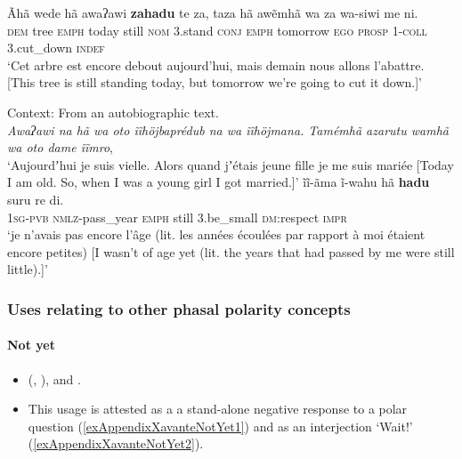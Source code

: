 \begin{exe}
	\ex\label{exAppendixXavante1}
	\gll Ãhã wede hã awaʔawi \textbf{zahadu} te za, taza hã awẽmhã wa za wa-siwi me ni.\\
	\textsc{dem} tree \textsc{emph} today still \textsc{nom} 3.stand \textsc{conj} \textsc{emph} tomorrow \textsc{ego} \textsc{prosp} 1-\textsc{coll} 3.cut\_down \textsc{indef}\\
	\glt \lq Cet arbre est encore debout aujourd'hui, mais demain nous allons l'abattre. [This tree is still standing today, but tomorrow we're going to cut it down.]\rq{ }\parencite[107]{Estevam2011}

	\ex Context: From an autobiographic text.\label{exAppendixXavante2}\\
	\textit{Awaʔawi na hã wa oto ĩĩhöjbaprédub na wa ĩĩhöjmana. Tamémhã azarutu wamhã wa oto dame ĩĩmro},\\
	\glt \lq Aujourdʼhui je suis vielle. Alors quand jʼétais jeune fille je me suis mariée [Today I am old. So, when I was a young girl I got married.]\rq{}
	\exi{}
	\gll ĩĩ-ãma ĩ-wahu hã \textbf{hadu} suru re di.\\	
	1\textsc{sg}-\textsc{pvb} \textsc{nmlz}-pass\_year \textsc{emph} still 3.be\_small \textsc{dm}:respect \textsc{impr}\\
	\glt \lq je n'avais pas encore l'âge (lit. les années écoulées par rapport à moi étaient encore petites) [I wasn't of age yet (lit. the years that had passed by me were still little).]\rq{ }\parencite[503]{Estevam2011}
\end{exe}

\subsubsection{Uses relating to other phasal polarity concepts}
\paragraph{Not yet}\label{appendixXavanteNotYet}
\begin{itemize}
	\item \citeauthor{Lachnitt1987} (\citeyear[47]{Lachnitt1987}, \citeyear[167]{Lachnitt1988}), \textcite[107]{Estevam2011} and \textcite[123, 209]{McLeod2004}.
	\item This usage is attested as a a stand-alone negative response to a polar question (\ref{exAppendixXavanteNotYet1}) and as an interjection \lq Wait!\rq{ }(\ref{exAppendixXavanteNotYet2}).
\end{itemize}

